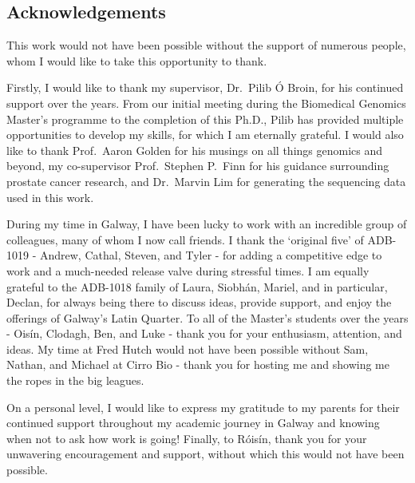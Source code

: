 \begin{center}
    \vspace*{1.5cm}
    \section*{Acknowledgements}
    \vspace{0.5cm}
\end{center}

\justifying
\normalsize

\noindent This work would not have been possible without the support of numerous people, whom I would like to take this opportunity to thank.

\vspace{0.5cm}

\noindent Firstly, I would like to thank my supervisor, Dr.~Pilib \'{O} Broin, for his continued support over the years. From our initial meeting during the Biomedical Genomics Master's programme to the completion of this Ph.D., Pilib has provided multiple opportunities to develop my skills, for which I am eternally grateful. I would also like to thank Prof.~Aaron Golden for his musings on all things genomics and beyond, my co-supervisor Prof.~Stephen P.~Finn for his guidance surrounding prostate cancer research, and Dr.~Marvin Lim for generating the sequencing data used in this work.

\vspace{0.5cm}

\noindent During my time in Galway, I have been lucky to work with an incredible group of colleagues, many of whom I now call friends. I thank the `original five' of ADB-1019 - Andrew, Cathal, Steven, and Tyler - for adding a competitive edge to work and a much-needed release valve during stressful times. I am equally grateful to the ADB-1018 family of Laura, Siobh\'{a}n, Mariel, and in particular, Declan, for always being there to discuss ideas, provide support, and enjoy the offerings of Galway's Latin Quarter. To all of the Master's students over the years - Ois\'{i}n, Clodagh, Ben, and Luke - thank you for your enthusiasm, attention, and ideas. My time at Fred Hutch would not have been possible without Sam, Nathan, and Michael at Cirro Bio - thank you for hosting me and showing me the ropes in the big leagues.

\vspace{0.5cm}

\noindent On a personal level, I would like to express my gratitude to my parents for their continued support throughout my academic journey in Galway and knowing when not to ask how work is going! Finally, to R\'{o}is\'{i}n, thank you for your unwavering encouragement and support, without which this would not have been possible.


\newpage